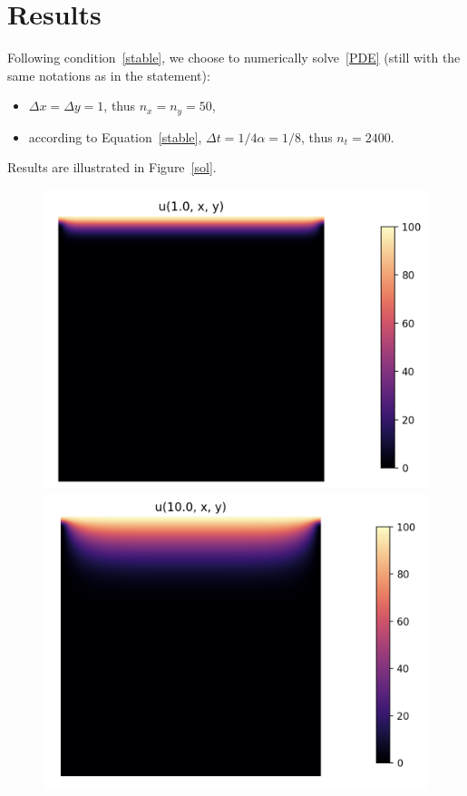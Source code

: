 \documentclass{article}
\begin{document}
\section{Results}
Following condition~\eqref{stable}, we choose to numerically solve~\eqref{PDE} (still with the same notations as in the statement): 
\begin{itemize}
	\item $\Delta x = \Delta y = 1$, thus $n_x = n_y = 50$,
	\item according to Equation~\ref{stable}, $\Delta t = 1/4\alpha = 1/8$, thus $n_t = 2400$.
\end{itemize}
Results are illustrated in Figure~\ref{sol}.

\begin{figure}[h!] 
\begin{minipage}[b]{0.50\linewidth}
	\centering
	\includegraphics[width=0.95\linewidth]{img/1._diff.png} 
\end{minipage} 
\begin{minipage}[b]{0.50\linewidth}
	\centering
	\includegraphics[width=0.95\linewidth]{img/10._diff.png} 

\end{minipage}
\end{figure}
\end{document}
